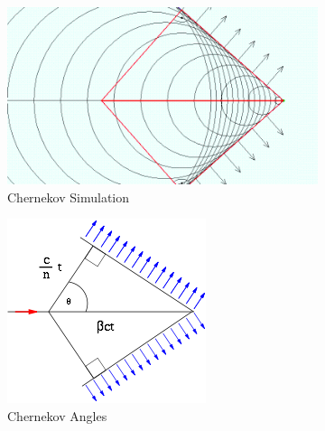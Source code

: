 \begin{figure}[H]
  \centering
  \begin{subfigure}[b]{0.45\textwidth}
      \includegraphics[width=\linewidth]{img/hadron/particleid-chernekov-wavefronts.png}
      \caption{Chernekov Simulation}
      \label{fig:particleid-chernekov-wavefronts}
  \end{subfigure}
  \begin{subfigure}[b]{0.30\textwidth}
      \includegraphics[width=\linewidth]{img/hadron/particleid-cherenkov-angles.png}
      \caption{Chernekov Angles}
      \label{fig:particleid-cherenkov-angles}
  \end{subfigure}
  \begin{subfigure}[b]{0.45\textwidth}

\end{subfigure}
\end{figure}
